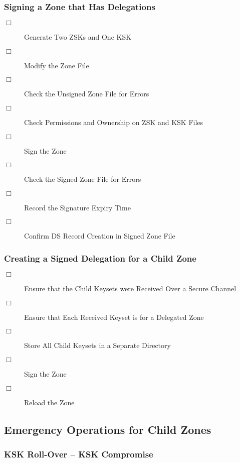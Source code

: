 \subsubsection{Signing a Zone that Has Delegations}

\begin{description}
\item [$\Box$] Generate Two ZSKs and One KSK
\item [$\Box$] Modify the Zone File
\item [$\Box$] Check the Unsigned Zone File for Errors
\item [$\Box$] Check Permissions and Ownership on ZSK and KSK Files
\item [$\Box$] Sign the Zone
\item [$\Box$] Check the Signed Zone File for Errors
\item [$\Box$] Record the Signature Expiry Time
\item [$\Box$] Confirm DS Record Creation in Signed Zone File
\end{description}


\subsubsection{Creating a Signed Delegation for a Child Zone}

\begin{description}
\item [$\Box$] Ensure that the Child Keysets were Received Over a Secure Channel
\item [$\Box$] Ensure that Each Received Keyset is for a Delegated Zone
\item [$\Box$] Store All Child Keysets in a Separate Directory
\item [$\Box$] Sign the Zone
\item [$\Box$] Reload the Zone
\end{description}


\clearpage
\subsection{Emergency Operations for Child Zones}


\subsubsection{KSK Roll-Over -- KSK Compromise}

